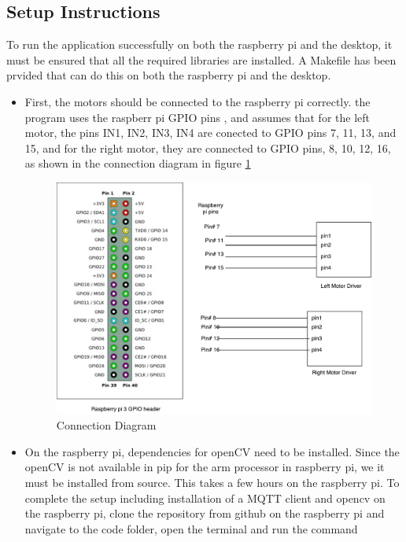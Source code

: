 \documentclass[sigconf]{acmart}
\begin{document}
%
%
\subsection{Setup Instructions}

To run the application successfully on both the raspberry pi and the desktop, it must be ensured that all the required libraries are installed. A Makefile has been prvided that can do this on both the raspberry pi and the desktop.

\begin{itemize}

\item First, the motors should be connected to the raspberry pi correctly.
the program uses the raspberr pi GPIO pins , and assumes that for the left motor, the pins IN1, IN2, IN3, IN4 are conected to GPIO pins 7, 11, 13, and 15, and for the right motor, they are connected to GPIO pins, 8, 10, 12, 16, as shown in the connection diagram in figure
\ref{f:connection}

\begin{figure}[!ht]
  \centering\includegraphics[width=\textwidth]{images/connection.pdf}
  \caption{Connection Diagram}\label{f:connection}
\end{figure}

\item On the raspberry pi, dependencies for openCV need to be installed. Since the openCV is not available in pip for the arm processor in raspberry pi, we it must be installed from source. This takes a few hours on the raspberry pi. To complete the setup including installation of a MQTT client and opencv on the raspberry pi, clone the repository from github on the raspberry pi and navigate to the code folder, open the terminal and run the command


\end{itemize}
\end{document}
